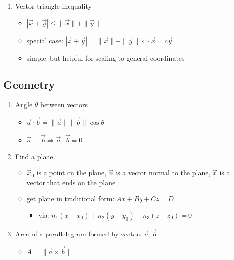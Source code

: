 \documentclass[10pt,letterpaper]{article}
\begin{document}
\begin{enumerate}
\item Vector triangle inequality

\begin{itemize}
\item $| \vec{x} + \vec{y}| \le \| \vec{x} \| + \| \vec{y} \|$
\item special case:  $| \vec{x} + \vec{y}| = \| \vec{x} \| + \| \vec{y} \| \Leftrightarrow \vec{x} = c \vec{y}$
\item simple, but helpful for scaling to general coordinates
\end{itemize}

\end{enumerate}
\subsection{Geometry}
\label{sec-1_2}


\begin{enumerate}
\item Angle $\theta$ between vectors

\begin{itemize}
\item $\vec{a} \cdot \vec{b} = \| \vec{a} \| \| \vec{b} \| \cos \theta$
\item $\vec{a} \perp \vec{b} \Rightarrow \vec{a} \cdot \vec{b} =0$
\end{itemize}

\item Find a plane

\begin{itemize}
\item $\vec{x}_0$ is a point on the plane, $\vec{n}$ is a vector normal to the plane, $\vec{x}$ is a vector that ends on the plane
\item get plane in traditional form: $Ax + By + Cz =D$

\begin{itemize}
\item via: $n_1(x-x_0) + n_2(y-y_0) + n_3(z-z_0)=0$
\end{itemize}

\end{itemize}

\setcounter{enumi}{28}
\item  Area of a parallelogram formed by vectors $\vec{a}, \vec{b}$

\begin{itemize}
\item $A = \| \vec{a} \times \vec{b} \|$
\end{itemize}

\end{enumerate}
\end{document}
